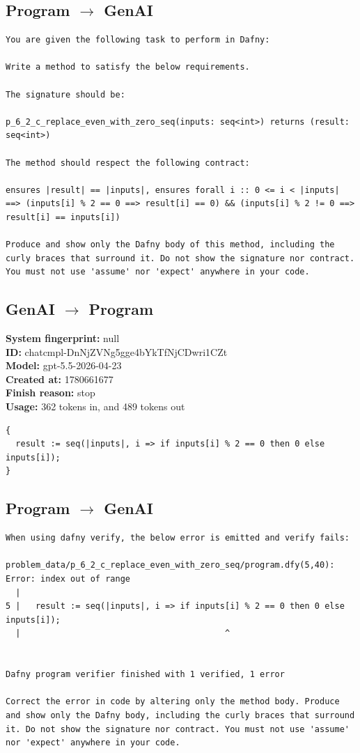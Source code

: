 \documentclass{article}
\begin{document}
\subsection*{Program $\rightarrow$ GenAI}
\begin{lstlisting}
You are given the following task to perform in Dafny:

Write a method to satisfy the below requirements.

The signature should be:

p_6_2_c_replace_even_with_zero_seq(inputs: seq<int>) returns (result: seq<int>)

The method should respect the following contract:

ensures |result| == |inputs|, ensures forall i :: 0 <= i < |inputs| ==> (inputs[i] % 2 == 0 ==> result[i] == 0) && (inputs[i] % 2 != 0 ==> result[i] == inputs[i])

Produce and show only the Dafny body of this method, including the curly braces that surround it. Do not show the signature nor contract. You must not use 'assume' nor 'expect' anywhere in your code.
\end{lstlisting}
\subsection*{GenAI $\rightarrow$ Program}
\textbf{System fingerprint: }null
\\\textbf{ID: }chatcmpl-DnNjZVNg5gge4bYkTfNjCDwri1CZt
\\\textbf{Model: }gpt-5.5-2026-04-23
\\\textbf{Created at: }1780661677
\\\textbf{Finish reason: }stop
\\\textbf{Usage: }362 tokens in, and 489 tokens out
\begin{lstlisting}
{
  result := seq(|inputs|, i => if inputs[i] % 2 == 0 then 0 else inputs[i]);
}
\end{lstlisting}
\subsection*{Program $\rightarrow$ GenAI}
\begin{lstlisting}
When using dafny verify, the below error is emitted and verify fails:

problem_data/p_6_2_c_replace_even_with_zero_seq/program.dfy(5,40): Error: index out of range
  |
5 |   result := seq(|inputs|, i => if inputs[i] % 2 == 0 then 0 else inputs[i]);
  |                                         ^


Dafny program verifier finished with 1 verified, 1 error

Correct the error in code by altering only the method body. Produce and show only the Dafny body, including the curly braces that surround it. Do not show the signature nor contract. You must not use 'assume' nor 'expect' anywhere in your code.
\end{lstlisting}
\end{document}
